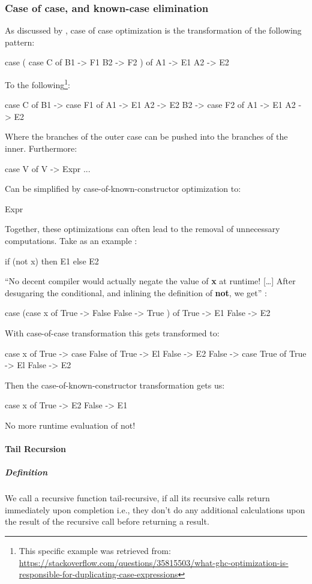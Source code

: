 \subsubsection{Case of case, and known-case elimination}
As discussed by \cite{Jones1996}, case of case optimization is the transformation of the following pattern:
\begin{spec}
case ( 
  case C of 
    B1 -> F1
    B2 -> F2
  ) of
  A1 -> E1
  A2 -> E2
\end{spec}
To the following\footnote{This specific example was retrieved from: \url{https://stackoverflow.com/questions/35815503/what-ghc-optimization-is-responsible-for-duplicating-case-expressions}}:
\begin{spec}
case C of    
  B1 -> case F1 of
    A1 -> E1
    A2 -> E2
  B2 -> case F2 of
    A1 -> E1
    A2 -> E2
\end{spec}
Where the branches of the outer case can be pushed into the branches of the inner.
Furthermore:
\begin{spec}
case V of
  V -> Expr
  ...
\end{spec}
Can be simplified by case-of-known-constructor optimization to:
\begin{spec}
Expr
\end{spec}
Together, these optimizations can often lead to the removal of unnecessary computations. Take as an example \citep{Jones1996}:
\begin{spec}
if (not x) then E1 else E2
\end{spec}
``No decent compiler would actually negate the value of \textbf{x} at runtime! [\ldots] After desugaring the conditional, and inlining the definition of \textbf{not}, we get'' \citep{Jones1996}:
\begin{spec}
case (case x of
  True -> False
  False -> True
) of 
  True -> E1 
  False -> E2
\end{spec}
With case-of-case transformation this gets transformed to:
\begin{spec}
case x of 
  True -> case False of
    True -> El
    False -> E2
  False -> case True of
    True -> El
    False -> E2
\end{spec}
Then the case-of-known-constructor transformation gets us:
\begin{spec}
case x of
  True -> E2
  False -> E1
\end{spec}
No more runtime evaluation of not!

\paragraph{Tail Recursion}\label{sec:tail}
\subparagraph{Definition}
We call a recursive function tail-recursive, if all its recursive calls return immediately upon completion i.e., they don't do any additional calculations upon the result of the recursive call before returning a result.

